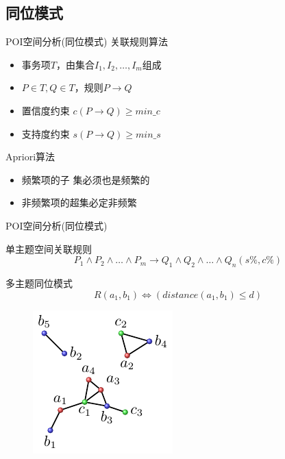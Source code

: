 \subsection{同位模式}

\begin{frame}[c]{POI空间分析(同位模式)}
    \alert{关联规则算法}

    \vspace{1em}
    \begin{itemize}
        \item 事务项$T$，由集合$I_1,I_2,\ldots,I_m$组成
        \item $P \in T, Q \in T$，规则$P \rightarrow Q$
        \item 置信度约束 $c(P \rightarrow Q) \ge min\_c$
        \item 支持度约束 $s(P \rightarrow Q) \ge min\_s$
    \end{itemize}

    \pause
    \vspace{1em}
    \alert{Apriori算法}

    \begin{itemize}
        \item 频繁项的子 集必须也是频繁的
        \item 非频繁项的超集必定非频繁
    \end{itemize}
\end{frame}

\begin{frame}[t]{POI空间分析(同位模式)}

    \begin{alert}{单主题空间关联规则}
     \begin{equation}
        P_1\wedge P_2\wedge \ldots \wedge P_m \rightarrow Q_1\wedge Q_2\wedge \ldots \wedge Q_n(s\%, c\%)
    \end{equation}
    \end{alert}

    \begin{alert}{多主题同位模式}
            \begin{equation}
                R(a_1,b_1) \Leftrightarrow (distance(a_1,b_1)\le d)
            \end{equation}

            \pause
            \begin{figure}
                \centering
                \includegraphics[scale=1.0]{figures/spatialrelation.pdf}
            \end{figure}
    \end{alert}

\end{frame}


